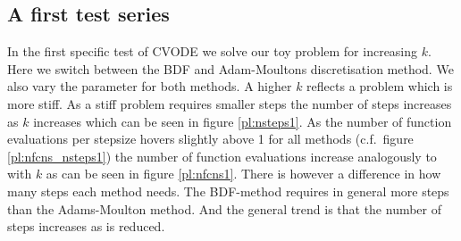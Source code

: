 \documentclass{scrartcl}
\begin{document}
\subsection*{A first test series}

In the first specific test of CVODE we solve our toy problem for increasing $k$. Here we switch between the BDF and Adam-Moultons discretisation method. We also vary the  parameter for both methods.
A higher $k$ reflects a problem which is more stiff. As a stiff problem requires smaller steps the number of steps  increases as $k$ increases which  can be seen in figure \ref{pl:nsteps1}. As the number of function evaluations per stepsize  hovers slightly above 1 for all methods (c.f.\ figure \ref{pl:nfcns_nsteps1}) the number of function evaluations increase analogously to  with $k$ as can be seen in figure \ref{pl:nfcns1}. There is however a difference in how many steps each method needs. The BDF-method requires in general more steps than the Adams-Moulton method. And the general trend is that the number of steps increases as  is reduced. 
\end{document}
